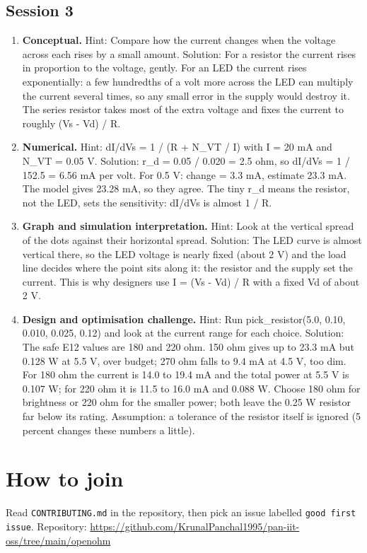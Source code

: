 \documentclass[11pt,a4paper]{article}
\begin{document}
\subsection*{Session 3}
\begin{enumerate}[nosep]
\item \textbf{Conceptual.} Hint: Compare how the current changes when the voltage across each rises by a small amount. Solution: For a resistor the current rises in proportion to the voltage, gently. For an LED the current rises exponentially: a few hundredths of a volt more across the LED can multiply the current several times, so any small error in the supply would destroy it. The series resistor takes most of the extra voltage and fixes the current to roughly (Vs - Vd) / R.
\item \textbf{Numerical.} Hint: dI/dVs = 1 / (R + N\_VT / I) with I = 20 mA and N\_VT = 0.05 V. Solution: r\_d = 0.05 / 0.020 = 2.5 ohm, so dI/dVs = 1 / 152.5 = 6.56 mA per volt. For 0.5 V: change = 3.3 mA, estimate 23.3 mA. The model gives 23.28 mA, so they agree. The tiny r\_d means the resistor, not the LED, sets the sensitivity: dI/dVs is almost 1 / R.
\item \textbf{Graph and simulation interpretation.} Hint: Look at the vertical spread of the dots against their horizontal spread. Solution: The LED curve is almost vertical there, so the LED voltage is nearly fixed (about 2 V) and the load line decides where the point sits along it: the resistor and the supply set the current. This is why designers use I = (Vs - Vd) / R with a fixed Vd of about 2 V.
\item \textbf{Design and optimisation challenge.} Hint: Run pick\_resistor(5.0, 0.10, 0.010, 0.025, 0.12) and look at the current range for each choice. Solution: The safe E12 values are 180 and 220 ohm. 150 ohm gives up to 23.3 mA but 0.128 W at 5.5 V, over budget; 270 ohm falls to 9.4 mA at 4.5 V, too dim. For 180 ohm the current is 14.0 to 19.4 mA and the total power at 5.5 V is 0.107 W; for 220 ohm it is 11.5 to 16.0 mA and 0.088 W. Choose 180 ohm for brightness or 220 ohm for the smaller power; both leave the 0.25 W resistor far below its rating. Assumption: a tolerance of the resistor itself is ignored (5 percent changes these numbers a little).
\end{enumerate}

\section{How to join}
Read \texttt{CONTRIBUTING.md} in the repository, then pick an issue labelled \texttt{good first issue}. Repository: \url{https://github.com/KrunalPanchal1995/pan-iit-oss/tree/main/openohm}
\end{document}
